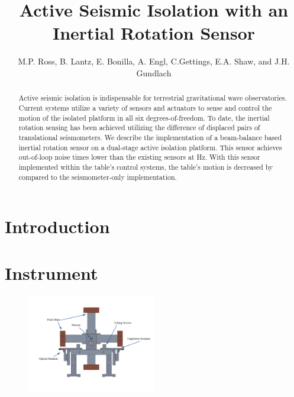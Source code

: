 \documentclass[twocolumn]{revtex4-1}
\begin{document}
\title{Active Seismic Isolation with an Inertial Rotation Sensor}
\author{M.P. Ross, B. Lantz, E. Bonilla, A. Engl,  C.Gettings, E.A. Shaw,  and J.H. Gundlach}

\begin{abstract}

Active seismic isolation is indispensable for terrestrial gravitational wave observatories. Current systems utilize a variety of sensors and actuators to sense and control the motion of the isolated platform in all six degrees-of-freedom. To date, the inertial rotation sensing has been achieved utilizing the difference of displaced pairs of translational seismometers. We describe the implementation of a beam-balance based inertial rotation sensor on a dual-stage active isolation platform. This sensor achieves out-of-loop noise  times lower than the existing sensors at  Hz. With this sensor implemented within the table's control systems, the table's motion is decreased by  compared to the seismometer-only implementation. 

\end{abstract}

\maketitle

\section{Introduction}

\section{Instrument}



\begin{figure}[!h]
\centering \includegraphics[width=0.5\textwidth]{cBRSFrontLabeled.pdf}
\caption{}
\label{apparatus} 
\end{figure}
\end{document}
